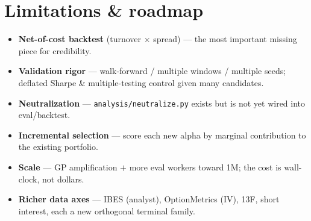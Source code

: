 \documentclass[11pt]{article}
\newcommand{\file}[1]{\texttt{#1}}
\begin{document}
\section{Limitations \& roadmap}
\begin{itemize}[leftmargin=*]
  \item \textbf{Net-of-cost backtest} (turnover $\times$ spread) --- the most important
  missing piece for credibility.
  \item \textbf{Validation rigor} --- walk-forward / multiple windows / multiple seeds;
  deflated Sharpe \& multiple-testing control given many candidates.
  \item \textbf{Neutralization} --- \file{analysis/neutralize.py} exists but is not yet
  wired into eval/backtest.
  \item \textbf{Incremental selection} --- score each new alpha by marginal
  contribution to the existing portfolio.
  \item \textbf{Scale} --- GP amplification $+$ more eval workers toward 1M; the cost is
  wall-clock, not dollars.
  \item \textbf{Richer data axes} --- IBES (analyst), OptionMetrics (IV), 13F, short
  interest, each a new orthogonal terminal family.
\end{itemize}
\end{document}
